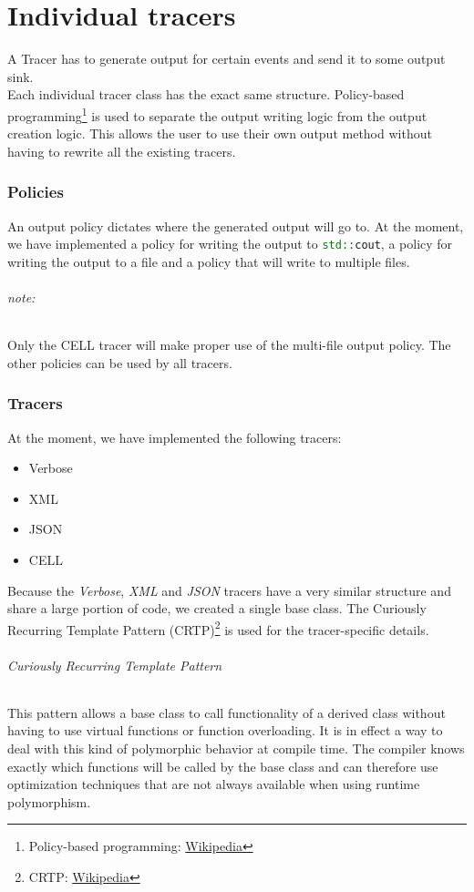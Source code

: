 \documentclass[12pt]{article}
\newcommand{\inlinecpp}[1]{\lstinline[language=c++]{#1}}
\begin{document}
\part*{Individual tracers}
A Tracer has to generate output for certain events and send it to some output sink.\\
Each individual tracer class has the exact same structure. Policy-based programming\footnote{Policy-based programming: \href{http://en.wikipedia.org/wiki/Policy-based_design}{Wikipedia}} is used to separate the output writing logic from the output creation logic. This allows the user to use their own output method without having to rewrite all the existing tracers.\\
\section{Policies}
An output policy dictates where the generated output will go to. At the moment, we have implemented a policy for writing the output to \inlinecpp{std::cout}, a policy for writing the output to a file and a policy that will write to multiple files.
\paragraph{note:} Only the CELL tracer will make proper use of the multi-file output policy. The other policies can be used by all tracers.
\section{Tracers}
At the moment, we have implemented the following tracers:
\begin{itemize}
	\item Verbose
	\item XML
	\item JSON
	\item CELL
\end{itemize}
Because the \emph{Verbose}, \emph{XML} and \emph{JSON} tracers have a very similar structure and share a large portion of code, we created a single base class. The Curiously Recurring Template Pattern (CRTP)\footnote{CRTP: \href{http://en.wikipedia.org/wiki/Curiously_recurring_template_pattern}{Wikipedia}} is used for the tracer-specific details.
\paragraph{Curiously Recurring Template Pattern} This pattern allows a base class to call functionality of a derived class without having to use virtual functions or function overloading. It is in effect a way to deal with this kind of polymorphic behavior at compile time. The compiler knows exactly which functions will be called by the base class and can therefore use optimization techniques that are not always available when using runtime polymorphism.
\end{document}
